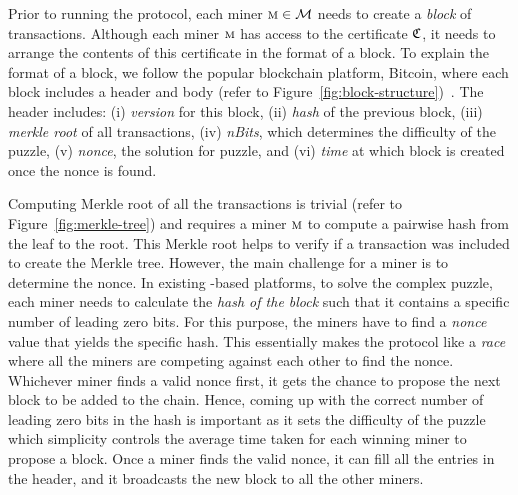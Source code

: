 Prior to running the \PoW{} protocol, each miner $\textsc{m} \in \mathcal{M}$ needs to 
create a {\em block} of transactions. Although each miner $\textsc{m}$ has access to the 
certificate $\mathfrak{C}$, it needs to arrange the contents of this certificate in 
the format of a block. To explain the format of a block, we follow the popular 
blockchain platform, Bitcoin, where each block includes a header and body 
(refer to Figure~\ref{fig:block-structure})~\cite{blockchain-book}. 
The header includes: 
(i) {\em version} for this block, 
(ii) {\em hash} of the previous block, 
(iii) {\em merkle root} of all transactions, 
(iv) {\em nBits}, which determines the difficulty of the puzzle, 
(v) {\em nonce}, the solution for puzzle, and 
(vi) {\em time} at which block is created once the nonce is found.

Computing Merkle root of all the transactions is trivial (refer to 
Figure~\ref{fig:merkle-tree}) and requires a miner $\textsc{m}$ to compute a pairwise 
hash from the leaf to the root. This Merkle root helps to verify if a transaction 
was included to create the Merkle tree. However, the main challenge for a miner is 
to determine the nonce. In existing \PoW{}-based platforms, to solve the complex 
puzzle, each miner needs to calculate the {\em hash of the block} such that it 
contains a specific number of leading zero bits. For this purpose, the miners have 
to find a {\em nonce} value that yields the specific hash. This essentially makes the 
\PoW{} protocol like a {\em race} where all the miners are competing against each 
other to find the nonce. Whichever miner finds a valid nonce first, it gets the chance 
to propose the next block to be added to the chain. Hence, coming up with the correct 
number of leading zero bits in the hash is important as it sets the difficulty of 
the puzzle which simplicity controls the average time taken for each winning miner 
to propose a block. Once a miner finds the valid nonce, it can fill all the entries 
in the header, and it broadcasts the new block to all the other miners.


